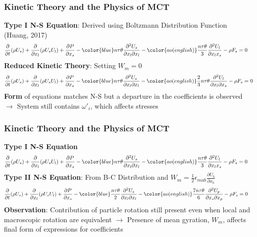 \documentclass{beamer}
\begin{document}
\begin{frame}
 \frametitle{Kinetic Theory and the Physics of MCT}
 \textbf{Type I N-S Equation}: Derived using Boltzmann Distribution Function 
(Huang, 2017)
  \begin{align*}
\begin{split}
&\frac{\partial}{\partial t}(\rho U_s)  + \frac{\partial}{\partial x_l}(\rho 
U_sU_l) + \frac{\partial P}{\partial x_s} - 
{\color{blue} n\tau\theta\frac{\partial^2 
U_s}{\partial x_l \partial x_l}} - 
{\color{ao(english)} \frac{n\tau\theta}{3}\frac{\partial^2 U_l}{\partial x_l 
x_s} } - \rho F_{s} = 0
\end{split}
\end{align*}
\textbf{Reduced Kinetic Theory}: Setting $W_m = 0$
\begin{equation*}
\frac{\partial}{\partial t}(\rho U_s) + \frac{\partial}{\partial x_l}(\rho 
U_sU_l) + \frac{\partial P}{\partial x_s} - {\color{blue} n\tau\theta 
\frac{\partial^2 U_s}{\partial x_l \partial x_l} } - {\color{ao(english)} 
 \frac{2}{3}n\tau\theta\frac{\partial^2 U_l}{\partial x_l 
\partial x_s}} - \rho F_{s} = 0
\end{equation*}
\pause
\textbf{Form} of equations matches N-S but a departure in the coefficients is 
observed \pause $\rightarrow$ System still contains $\omega'_{i}$, which 
affects stresses 
\end{frame}

\begin{frame}
 \frametitle{Kinetic Theory and the Physics of MCT}
 \textbf{Type I N-S Equation}
 \begin{align*}
\begin{split}
&\frac{\partial}{\partial t}(\rho U_s)  + \frac{\partial}{\partial x_l}(\rho 
U_sU_l) + \frac{\partial P}{\partial x_s} - 
{\color{blue} n\tau\theta\frac{\partial^2 
U_s}{\partial x_l \partial x_l}} - 
{\color{ao(english)} \frac{n\tau\theta}{3}\frac{\partial^2 U_l}{\partial x_l 
x_s} } - \rho F_{s} = 0
\end{split}
\end{align*}
\textbf{Type II N-S Equation}: From B-C Distribution and {\color{red}$W_{m} = 
\frac{1}{2}\epsilon_{mab}\frac{\partial U_{b}}{\partial x_a}$}
\begin{align*}
&\frac{\partial}{\partial t}(\rho U_s)  + \frac{\partial}{\partial x_l}(\rho 
U_sU_l) + \frac{\partial P}{\partial x_s} - 
{\color{blue} \frac{n\tau \theta}{2}\frac{\partial^2 U_s}{\partial x_l \partial 
x_l}} - 
{\color{ao(english)} \frac{7n\tau \theta}{6}\frac{\partial^2 U_{p}}{\partial 
x_s \partial x_p}} - 
\rho F_s = 0
\end{align*}
\pause
\textbf{Observation}: Contribution of particle rotation still present even when 
local and macroscopic rotation are equivalent \pause $\rightarrow$ Presence of 
mean gyration, $W_m$, affects final form of expressions for coefficients 
\end{frame}
\end{document}
